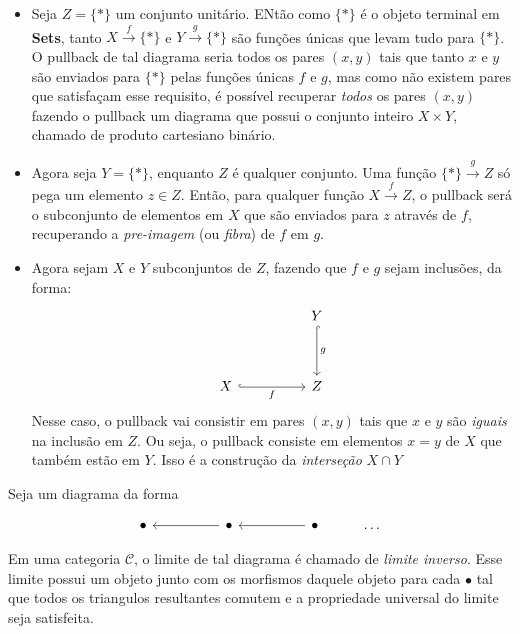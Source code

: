 \documentclass[../main.tex]{subfiles}
\begin{document}
\begin{itemize}
    \item Seja $Z = \{\ast\}$ um conjunto unitário. ENtão como $\{\ast\}$ é o objeto terminal em \textbf{Sets}, tanto $X \xrightarrow{f} \{\ast\}$ e $Y \xrightarrow{g} \{\ast\}$ são funções únicas que levam tudo para $\{\ast\}$. O pullback de tal diagrama seria todos os pares $(x, y)$ tais que tanto $x$ e $y$ são enviados para $\{\ast\}$ pelas funções únicas $f$ e $g$, mas como não existem pares que satisfaçam esse requisito, é possível recuperar \emph{todos} os pares $(x, y)$ fazendo o pullback um diagrama que possui o conjunto inteiro $X \times Y$, chamado de produto cartesiano binário.
    \item Agora seja $Y = \{\ast\}$, enquanto $Z$ é qualquer conjunto. Uma função $\{\ast\} \xrightarrow{g} Z$ só pega um elemento $z \in Z$. Então, para qualquer função $X \xrightarrow{f} Z$, o pullback será o subconjunto de elementos em $X$ que são enviados para $z$ através de $f$, recuperando a \emph{pre-imagem} (ou \emph{fibra}) de $f$ em $g$.
    \item Agora sejam $X$ e $Y$ subconjuntos de $Z$, fazendo que $f$ e $g$ sejam inclusões, da forma:
\[\begin{tikzcd}
	&& Y \\
	\\
	X && Z
	\arrow["g", hook, from=1-3, to=3-3]
	\arrow["f"', hook, from=3-1, to=3-3]
\end{tikzcd}\]
Nesse caso, o pullback vai consistir em pares $(x, y)$ tais que $x$ e $y$ são \emph{iguais} na inclusão em $Z$. Ou seja, o pullback consiste em elementos $x = y$ de $X$ que também estão em $Y$. Isso é a construção da \emph{interseção} $X \cap Y$ 
\end{itemize}

Seja um diagrama da forma 

\[\begin{tikzcd}
	\bullet && \bullet && \bullet & \dots
	\arrow[from=1-3, to=1-1]
	\arrow[from=1-5, to=1-3]
\end{tikzcd}\]

Em uma categoria $\mathcal{C}$, o limite de tal diagrama é chamado de \emph{limite inverso}. Esse limite possui um objeto junto com os morfismos daquele objeto para cada $\bullet$ tal que todos os triangulos resultantes comutem e a propriedade universal do limite seja satisfeita.
\end{document}
